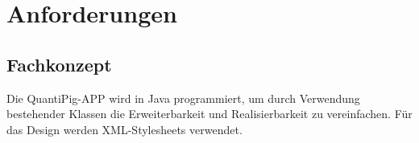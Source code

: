 %

%
%

\section{Anforderungen}

\subsection{\textbf{Fachkonzept}}
Die \acs{QuantiPig}-APP  wird in Java programmiert, um durch Verwendung bestehender Klassen die Erweiterbarkeit und Realisierbarkeit zu vereinfachen. Für das Design werden \acs{XML}-Stylesheets verwendet.



